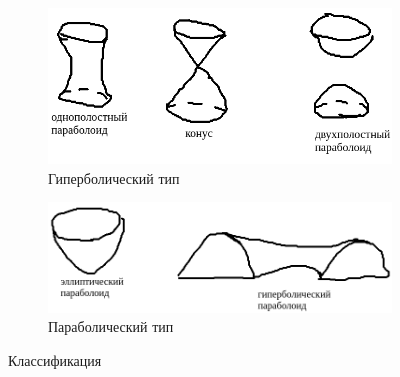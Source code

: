 \begin{figure}[!ht]
    \begin{subfigure}{0.45\textwidth}
    	\includegraphics[scale=0.4]{giperb}
        \caption{Гиперболический тип}
        \label{im:1}
    \end{subfigure}
    \begin{subfigure}{0.45\textwidth}
    	\includegraphics[scale=0.4]{parab}
        \caption{Параболический тип}
        \label{im:2}
    \end{subfigure}
    \caption{Классификация}
\end{figure}
